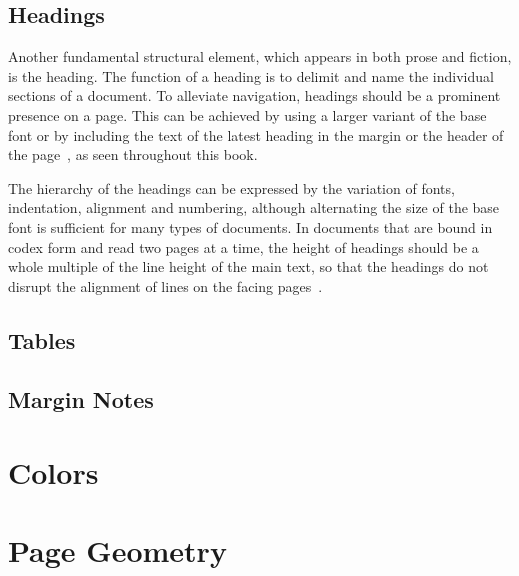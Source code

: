 \subsection{Headings}
Another fundamental structural element, which appears in both prose and fiction,
is the heading. The function of a heading is to delimit and name the individual
sections of a document. To alleviate navigation, headings should be a prominent
presence on a page. This can be achieved by using a larger variant of the base
font or by including the text of the latest heading in the margin or the header
of the page~\cite[sec.\,4.2.1]{bringhurst92}, as seen throughout this book.

The hierarchy of the headings can be expressed by the variation of fonts,
indentation, alignment and numbering, although alternating the size of the base
font is sufficient for many types of documents. In documents that are bound in
codex form and read two pages at a time, the height of headings should be a
whole multiple of the line height of the main text, so that the headings do not
disrupt the alignment of lines on the facing pages~\Cite[para.\,33]{kapr99}.


\subsection{Tables}
\subsection{Margin Notes}

\section{Colors}
\section{Page Geometry}
